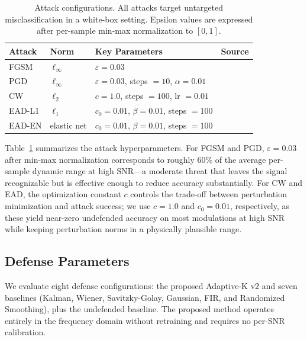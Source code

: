 \begin{table}[t]
\caption{Attack configurations. All attacks target untargeted misclassification
  in a white-box setting. Epsilon values are expressed after per-sample min-max
  normalization to $[0,1]$.}
\label{tab:attacks}
\centering
\small
\begin{tabular}{llll}
\toprule
Attack & Norm & Key Parameters & Source \\
\midrule
FGSM   & $\ell_\infty$ & $\varepsilon = 0.03$                     & \cite{goodfellow2015fgsm} \\
PGD    & $\ell_\infty$ & $\varepsilon = 0.03$, steps $= 10$, $\alpha = 0.01$ & \cite{madry2018pgd} \\
CW     & $\ell_2$      & $c = 1.0$, steps $= 100$, lr $= 0.01$   & \cite{carlini2017towards} \\
EAD-L1 & $\ell_1$      & $c_0 = 0.01$, $\beta = 0.01$, steps $= 100$ & \cite{chen2020ead} \\
EAD-EN & elastic net   & $c_0 = 0.01$, $\beta = 0.01$, steps $= 100$ & \cite{chen2020ead} \\
\bottomrule
\end{tabular}
\end{table}

Table~\ref{tab:attacks} summarizes the attack hyperparameters.  For FGSM and
PGD, $\varepsilon = 0.03$ after min-max normalization corresponds to roughly
60\% of the average per-sample dynamic range at high SNR---a moderate threat
that leaves the signal recognizable but is effective enough to reduce accuracy
substantially.  For CW and EAD, the optimization constant $c$ controls the
trade-off between perturbation minimization and attack success; we use $c=1.0$
and $c_0=0.01$, respectively, as these yield near-zero undefended accuracy on
most modulations at high SNR while keeping perturbation norms in a physically
plausible range.

\subsection{Defense Parameters}

We evaluate eight defense configurations: the proposed Adaptive-K v2 and
seven baselines (Kalman, Wiener, Savitzky-Golay, Gaussian, FIR, and
Randomized Smoothing), plus the undefended baseline.  The proposed method
operates entirely in the frequency domain without retraining and requires
no per-SNR calibration.

